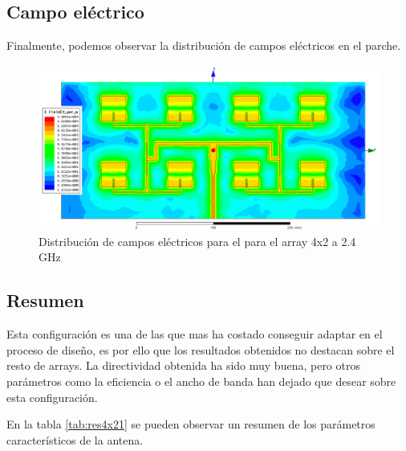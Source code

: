 \subsection{Campo eléctrico}
\par Finalmente, podemos observar la distribución de campos eléctricos en el parche. 

\begin{figure}[H]
    \centering
        \includegraphics[width=\textwidth]{archivos/analisis/4x21/8}
        \caption{Distribución de campos eléctricos para el para el array 4x2 a 2.4 GHz}
        \label{fig:elec4x21}
\end{figure}

\subsection{Resumen}
\par Esta configuración es una de las que mas ha costado conseguir adaptar en el proceso de diseño, es por ello que los resultados obtenidos no destacan sobre el resto de arrays. La directividad obtenida ha sido muy buena, pero otros parámetros como la eficiencia o el ancho de banda han dejado que desear sobre esta configuración. 
\\
\par En la tabla \ref{tab:res4x21} se pueden observar un resumen de los parámetros característicos de la antena.

